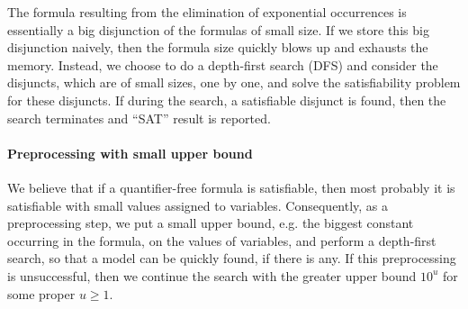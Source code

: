 The {\pa} formula resulting from the elimination of exponential occurrences is essentially a big disjunction of the formulas of small size. If we store this big disjunction naively, then the formula size quickly blows up and exhausts the memory. Instead, we choose to do a depth-first search (DFS) and consider the disjuncts, which are of small sizes, one by one, and solve the satisfiability problem for these disjuncts. If during the search, a satisfiable disjunct is found, then the search terminates and ``SAT'' result is reported.

\paragraph{Preprocessing with small upper bound}

We believe that if a quantifier-free {\paexp} formula is satisfiable, then most probably it is satisfiable with small values assigned to variables. Consequently, as a preprocessing step, we put a small upper bound, e.g. the biggest constant occurring in the formula, on the values of variables, and perform a depth-first search, so that a model can be quickly found, if there is any. If this preprocessing is unsuccessful, then we continue the search with the greater upper bound $10^u$ for some proper $u \ge 1$.




